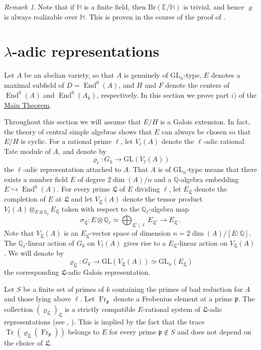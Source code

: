 \documentclass[oneside]{amsart}
\theoremstyle{remark}
\newtheorem{remark}[theorem]{Remark}
\newcommand{\Q}{\mathbb Q}
\newcommand{\kbar}{{\bar{k}}}
\newcommand{\GL}{\mathrm{GL}}
\newcommand{\End}{\operatorname{End}}
\newcommand{\Frob}{\operatorname{Fr}}
\newcommand{\Br}{\mathrm{Br}}
\newcommand{\p}{\mathfrak{p}}
\newcommand{\Tr}{\operatorname{Tr}}
\newcommand{\Ll}{\mathfrak{L}}
\newcommand{\Hg}{\mathbb{H}}
\newcommand{\Eg}{\mathbb{E}}
\numberwithin{equation}{section}
\begin{document}
\begin{remark}
Note that if $\Hg$ is a finite field, then $\Br(\Eg/\Hg)$ is trivial, and hence $\varrho$ is always realizable over $\Hg$. This is proven in the course of the proof of \cite[Lem. 3.1]{Jon16}.
\end{remark}

\section{$\lambda$-adic representations}\label{section: lambdaadic}

Let $A$ be an abelian variety, so that $A$ is genuinely of $\GL_n$-type, $E$ denotes a maximal subfield of $D=\End^0(A)$, and $H$ and $F$ denote the centers of $\End^0(A)$ and $\End^0(A_\kbar)$, respectively. In this section we prove part $i)$ of the \hyperref[thm:main]{Main Theorem}.

Throughout this section we will assume that $E/H$ is a Galois extension. In fact, the theory of central simple algebras shows that $E$ can always be chosen so that $E/H$ is cyclic. 
For a rational prime $\ell$, let $V_\ell(A)$ denote the $\ell$-adic rational Tate module of $A$, and denote by 
$$
\varrho_\ell\colon G_k\rightarrow \GL(V_\ell(A))
$$
the $\ell$-adic representation attached to $A$.
That $A$ is of $\GL_n$-type means that there exists a number field $E$ of degree $2\dim(A)/n$ and a $\Q$-algebra embedding $E\hookrightarrow \End^0(A)$.
For every prime $\Ll$ of $E$ dividing $\ell$, let $E_\Ll$ denote the completion of $E$ at $\Ll$ and let $V_\Ll(A)$ denote the tensor product $V_\ell(A) \otimes_{E\otimes \Q_\ell} E_\Ll$ taken with respect to the $\Q_\ell$-algebra map
$$
\sigma_\Ll\colon E \otimes \Q_\ell\simeq \bigoplus_{\Ll' \mid \ell} E_{\Ll'} \rightarrow E_\Ll\,. 
$$
Note that $V_\Ll(A)$ is an $E_\Ll$-vector space of dimension $n=2\dim(A)/[E:\Q]$. The $\Q_\ell$-linear action of $G_k$ on $V_\ell(A)$ gives rise to a $E_\Ll$-linear action on $V_\Ll(A)$. We will denote by
$$
\varrho_{\Ll}\colon G_k\rightarrow \GL(V_\Ll(A))\simeq \GL_n(E_\Ll)
$$
the corresponding $\Ll$-adic Galois representation.

Let $S$ be a finite set of primes of $k$ containing the primes of bad reduction for $A$ and those lying above $\ell$. Let $\Frob_\p$ denote a Frobenius element at a prime $\p$. The collection $(\varrho_\Ll)_\Ll$ is a strictly compatible $E$-rational system of $\Ll$-adic representations (see \cite{Ser89}, \cite[Chap. II]{Rib76}). This is implied by the fact that the trace $\Tr(\varrho_\Ll(\Frob_\p))$ belongs to $E$ for every prime $\p\not \in S$ and does not depend on the choice of $\Ll$.
\end{document}

